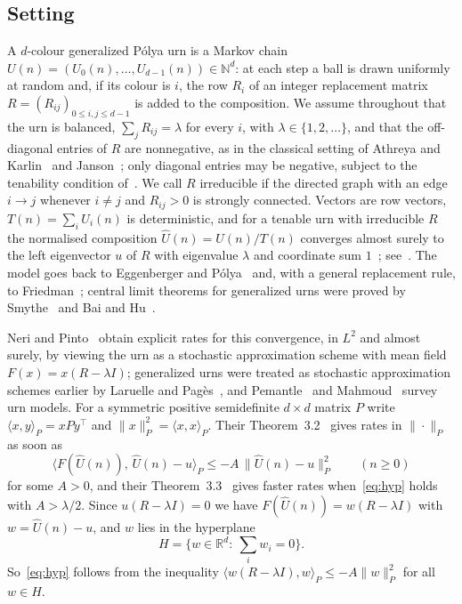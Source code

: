 \documentclass[11pt]{amsart}
\theoremstyle{definition}
\theoremstyle{remark}
\newcommand{\R}{\mathbb R}
\begin{document}
\subsection*{Setting}
A $d$-colour generalized P\'olya urn is a Markov chain $U(n)=(U_0(n),\dots,U_{d-1}(n))\in\mathbb N^d$: at each step a ball is drawn uniformly at random and, if its colour is $i$, the row $R_i$ of an integer replacement matrix $R=(R_{ij})_{0\le i,j\le d-1}$ is added to the composition. We assume throughout that the urn is balanced, $\sum_j R_{ij}=\lambda$ for every $i$, with $\lambda\in\{1,2,\dots\}$, and that the off-diagonal entries of $R$ are nonnegative, as in the classical setting of Athreya and Karlin~\cite{AK} and Janson~\cite{Janson}; only diagonal entries may be negative, subject to the tenability condition of~\cite[p.~2]{NP}. We call $R$ irreducible if the directed graph with an edge $i\to j$ whenever $i\ne j$ and $R_{ij}>0$ is strongly connected. Vectors are row vectors, $T(n)=\sum_i U_i(n)$ is deterministic, and for a tenable urn with irreducible $R$ the normalised composition $\widehat U(n)=U(n)/T(n)$ converges almost surely to the left eigenvector $u$ of $R$ with eigenvalue $\lambda$ and coordinate sum $1$~\cite{AK,Janson}; see~\cite[Theorem~1.1]{NP}. The model goes back to Eggenberger and P\'olya~\cite{EP} and, with a general replacement rule, to Friedman~\cite{Fri}; central limit theorems for generalized urns were proved by Smythe~\cite{Smy} and Bai and Hu~\cite{BH}.

Neri and Pinto~\cite{NP} obtain explicit rates for this convergence, in $L^2$ and almost surely, by viewing the urn as a stochastic approximation scheme with mean field $F(x)=x(R-\lambda I)$; generalized urns were treated as stochastic approximation schemes earlier by Laruelle and Pag\`es~\cite{LP}, and Pemantle~\cite{Pem} and Mahmoud~\cite{Mah} survey urn models. For a symmetric positive semidefinite $d\times d$ matrix $P$ write $\langle x,y\rangle_P=xPy^{\top}$ and $\|x\|_P^2=\langle x,x\rangle_P$. Their Theorem~3.2~\cite[p.~10]{NP} gives rates in $\|\cdot\|_P$ as soon as
\begin{equation}\label{eq:hyp}
\big\langle F(\widehat U(n)),\,\widehat U(n)-u\big\rangle_P\le -A\,\|\widehat U(n)-u\|_P^2\qquad(n\ge 0)
\end{equation}
for some $A>0$, and their Theorem~3.3~\cite[p.~12]{NP} gives faster rates when~\eqref{eq:hyp} holds with $A>\lambda/2$. Since $u(R-\lambda I)=0$ we have $F(\widehat U(n))=w(R-\lambda I)$ with $w=\widehat U(n)-u$, and $w$ lies in the hyperplane
\[
H=\Big\{w\in\R^d:\ \textstyle\sum_{i}w_i=0\Big\}.
\]
So~\eqref{eq:hyp} follows from the inequality $\langle w(R-\lambda I),w\rangle_P\le-A\|w\|_P^2$ for all $w\in H$.
\end{document}
